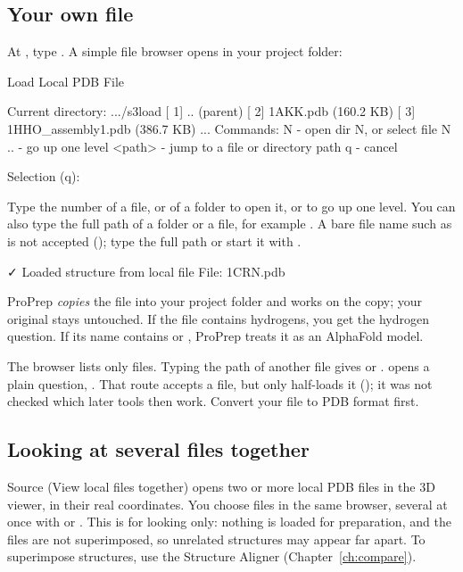 \subsection{Your own file}
\label{sec:structure-local}

At , type . A simple file browser opens in your
project folder:
\begin{screen}
Load Local PDB File

Current directory: .../s3load
  [ 1] .. (parent)
  [ 2] 1AKK.pdb  (160.2 KB)
  [ 3] 1HHO_assembly1.pdb  (386.7 KB)
...
Commands:
  N          - open dir N, or select file N
  ..         - go up one level
  <path>     - jump to a file or directory path
  q          - cancel

Selection (q):
\end{screen}
Type the number of a file, or of a folder to open it, or  to go up
one level. You can also type the full path of a folder or a file, for example
. A bare file name such as
 is not accepted (); type the full path or start it with .
\begin{screen}
✓ Loaded structure from local file
  File: 1CRN.pdb
\end{screen}
ProPrep \emph{copies} the file into your project folder and works on the copy;
your original stays untouched. If the file contains hydrogens, you get the
hydrogen question. If its name contains  or , ProPrep
treats it as an AlphaFold model.

The browser lists only  files. Typing the path of another file gives
 or .
 opens a plain question, . That route
accepts a  file, but only half-loads it (); it was not checked which later tools then work. Convert your file
to PDB format first.

\subsection{Looking at several files together}

Source  (View local files together) opens two or more local PDB files in
the 3D viewer, in their real coordinates. You choose files in the same browser,
several at once with  or . This is for looking only:
nothing is loaded for preparation, and the files are not superimposed, so
unrelated structures may appear far apart. To superimpose structures, use the
Structure Aligner (Chapter~\ref{ch:compare}).


